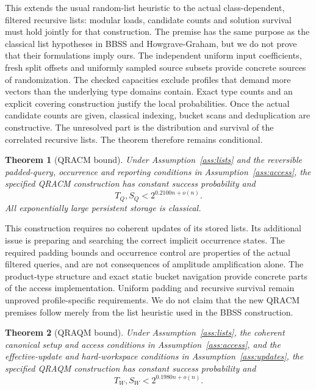 \documentclass[10pt,a4paper]{article}
\newtheorem{theorem}{Theorem}[section]
\theoremstyle{definition}
\begin{document}
This extends the usual random-list heuristic to the actual
class-dependent, filtered recursive lists: modular loads, candidate
counts and solution survival must hold jointly for that construction.
The premise has the same purpose as the classical list hypotheses in
BBSS and Howgrave-Graham, but we do not prove that their formulations
imply ours. The independent uniform input coefficients, fresh split
offsets and uniformly sampled source subsets provide concrete sources
of randomization. The checked capacities exclude profiles that demand
more vectors than the underlying type domains contain. Exact type
counts and an explicit covering construction
justify the local probabilities. Once the actual candidate counts are
given, classical indexing, bucket scans and deduplication are constructive.
The unresolved part is the distribution and survival of the correlated
recursive lists. The theorem therefore remains conditional.

\begin{theorem}[QRACM bound]\label{thm:qracm}
Under Assumption~\ref{ass:lists} and the reversible padded-query,
occurrence and reporting conditions in Assumption~\ref{ass:access},
the specified QRACM construction has constant success probability and
\[
 T_Q,S_Q<2^{0.2100n+o(n)}.
\]
All exponentially large persistent storage is classical.
\end{theorem}

This construction requires no coherent updates of its stored lists.
Its additional issue is preparing and searching the correct implicit
occurrence states. The required padding bounds and occurrence control
are properties of the actual filtered queries, and are not consequences
of amplitude amplification alone. The product-type structure and exact
static bucket navigation provide concrete parts of the access
implementation. Uniform padding and recursive survival remain
unproved profile-specific requirements. We do not claim that the new
QRACM premises follow merely from the list heuristic used in the BBSS
construction.

\begin{theorem}[QRAQM bound]\label{thm:qraqm}
Under Assumption~\ref{ass:lists}, the coherent canonical setup and access
conditions in Assumption~\ref{ass:access}, and the effective-update and
hard-workspace conditions in Assumption~\ref{ass:updates}, the specified
QRAQM construction has constant success probability and
\[
 T_W,S_W<2^{0.1980n+o(n)}.
\]
\end{theorem}
\end{document}
